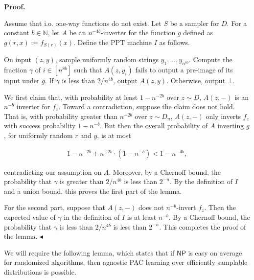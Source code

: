 \documentclass[10pt,a4paper]{article}
\begin{document}
\par\medskip\noindent\textbf{Proof.}\par




Assume that i.o. one-way functions do not exist. Let $S$ be a sampler for $D$. For a constant $b\in\mathbb{N}$, let $A$ be an $n^{-4b}$-inverter for the function $g$ defined as $g(r,x):=f_{S(r)}(x)$. Define the PPT machine $I$ as follows.\par



On input $(z,y)$, sample uniformly random strings $y_{1},...,y_{n^{8b}}$. Compute the fraction $\gamma$ of $i\in[n^{8b}]$ such that $A(z,y_{i})$ fails to output a pre-image of its input under $g$. If $\gamma$ is less than $2/n^{4b}$, output $A(z,y)$. Otherwise, output $\bot$.\par



We first claim that, with probability at least $1-n^{-2b}$ over $z\sim D$, $A(z,-)$ is an $n^{-b}$ inverter for $f_{z}$. Toward a contradiction, suppose the claim does not hold. That is, with probability greater than $n^{-2b}$ over $z\sim D_{n}$, $A(z,-)$ only inverts $f_{z}$ with success probability $1-n^{-b}$. But then the overall probability of $A$ inverting $g$, for uniformly random $r$ and $y$, is at most\par


\[\begin{gathered}
1-n^{-2b}+n^{-2b}\cdot(1-n^{-b})<1-n^{-4b},
\end{gathered}\]


contradicting our assumption on $A$. Moreover, by a Chernoff bound, the probability that $\gamma$ is greater than $2/n^{4b}$ is less than $2^{-n}$. By the definition of $I$ and a union bound, this proves the first part of the lemma.\par




For the second part, suppose that $A(z,-)$ does not $n^{-b}$-invert $f_{z}$. Then the expected value of $\gamma$ in the definition of $I$ is at least $n^{-b}$. By a Chernoff bound, the probability that $\gamma$ is less than $2/n^{4b}$ is less than $2^{-n}$. This completes the proof of the lemma.
$\blacktriangleleft$\par




We will require the following lemma, which states that if ${\mathsf{NP}}$ is easy on average for randomized algorithms, then agnostic PAC learning over efficiently samplable distributions is possible.\par
\end{document}
